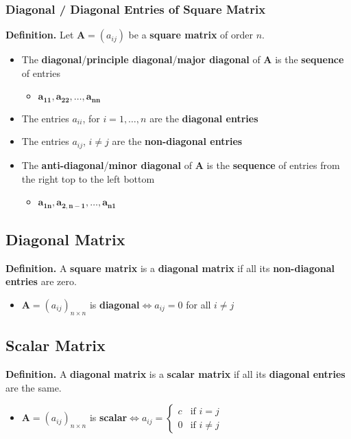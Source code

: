 \documentclass[../ma2001_notes.tex]{subfiles}
\begin{document}
\subsubsection{Diagonal / Diagonal Entries of Square Matrix}
\textbf{Definition.} Let \(\bm{A}=(a_{ij})\) be a \textbf{square matrix} of order \(n\).
\begin{itemize}
	\item The \textbf{diagonal}/\textbf{principle diagonal}/\textbf{major diagonal} of \(\bm{A}\) is the \textbf{sequence} of entries
	\begin{itemize}
		\item\(\bm{a_{11},a_{22},\ldots,a_{nn}}\)
	\end{itemize}
	\item The entries \(a_{ii}\), for \(i=1,\ldots,n\) are the \textbf{diagonal entries}
	\item The entries \(a_{ij}\), \(i\ne j\) are the \textbf{non-diagonal entries}
	\item The \textbf{anti-diagonal}/\textbf{minor diagonal} of \(\bm{A}\) is the \textbf{sequence} of entries from the right top to the left bottom
	\begin{itemize}
		\item\(\bm{a_{1n},a_{2,n-1},\ldots,a_{n1}}\)
	\end{itemize}
\end{itemize}

\subsection{Diagonal Matrix}
\textbf{Definition.} A \textbf{square matrix} is a \textbf{diagonal matrix} if all its \textbf{non-diagonal entries} are zero.
\begin{itemize}
	\item\(\bm{A}=(a_{ij})_{n\times n}\) is \textbf{diagonal}\(\iff a_{ij}=0\) for all \(i\ne j\)
\end{itemize}

\subsection{Scalar Matrix}
\textbf{Definition.} A \textbf{diagonal matrix} is a \textbf{scalar matrix} if all its \textbf{diagonal entries} are the same.
\begin{itemize}
	\item\(\bm{A}=(a_{ij})_{n\times n}\) is \textbf{scalar}\(\iff a_{ij}=\begin{cases}
		c & \text{if }i=j \\
		0 & \text{if }i\ne j
	\end{cases}\)
\end{itemize}
\end{document}
